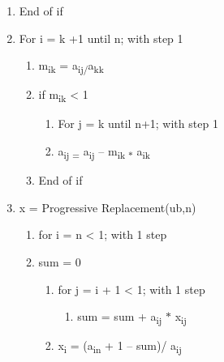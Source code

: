 \documentclass[12pt]{article}
\renewcommand{\_}{\kern-1.5pt\textunderscore\kern-1.5pt}
\begin{document}
\begin{enumerate}
\begin{enumerate}
\begin{enumerate}
\end{enumerate}
	\item End of if\par

	\item For i = k +1 until n; with step 1 \par

\begin{enumerate}
	\item m\textsubscript{ik }= a\textsubscript{ij/}a\textsubscript{kk}\par

	\item if m\textsubscript{ik} < 1\par

\begin{enumerate}
	\item For j = k until n+1; with step 1 \par

	\item a\textsubscript{ij = }a\textsubscript{ij }– m\textsubscript{ik $\ast$ } a\textsubscript{ik}\par


\end{enumerate}
	\item End of if\par


\end{enumerate}
	\item x = Progressive Replacement(ub,n)\par

\begin{enumerate}
	\item for i = n < 1; with 1 step\par

	\item sum = 0\par

\begin{enumerate}
	\item for j = i + 1 < 1; with 1 step\par

\begin{enumerate}
	\item sum = sum + a\textsubscript{ij }$\ast$  x\textsubscript{ij}\par


\end{enumerate}
	\item x\textsubscript{i }= (a\textsubscript{in }+ 1 – sum)/ a\textsubscript{ij}
\end{enumerate}
\end{enumerate}
\end{enumerate}
\end{enumerate}\par


\vspace{\baselineskip}

\printbibliography
\end{document}
